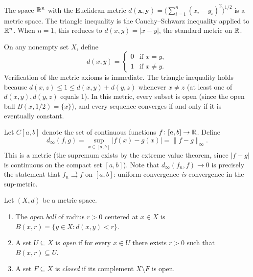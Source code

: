 \documentclass[11pt,a4paper]{article}
\begin{document}
\begin{example}
\label{ex:euclidean_metric}
The space $\mathbb{R}^n$ with the Euclidean metric
$d(\mathbf{x}, \mathbf{y}) = \bigl(\sum_{i=1}^n (x_i - y_i)^2
\bigr)^{1/2}$ is a metric space. The triangle inequality is the
Cauchy--Schwarz inequality applied to $\mathbb{R}^n$. When $n = 1$, this
reduces to $d(x, y) = |x - y|$, the standard metric on $\mathbb{R}$.
\end{example}

\begin{example}
\label{ex:discrete_metric}
On any nonempty set $X$, define
\[
  d(x, y) = \begin{cases} 0 & \text{if } x = y, \\ 1 & \text{if } x \neq y. \end{cases}
\]
Verification of the metric axioms is immediate. The triangle inequality
holds because $d(x, z) \le 1 \le d(x, y) + d(y, z)$ whenever
$x \neq z$ (at least one of $d(x, y), d(y, z)$ equals $1$). In this
metric, every subset is open (since the open ball $B(x, 1/2) = \{x\}$),
and every sequence converges if and only if it is eventually constant.
\end{example}

\begin{example}
\label{ex:sup_metric}
Let $C[a, b]$ denote the set of continuous functions
$f \colon [a, b] \to \mathbb{R}$. Define
\[
  d_\infty(f, g) = \sup_{x \in [a, b]} |f(x) - g(x)|
  = \|f - g\|_\infty.
\]
This is a metric (the supremum exists by the extreme value theorem,
since $|f - g|$ is continuous on the compact set $[a, b]$). Note that
$d_\infty(f_n, f) \to 0$ is precisely the statement that
$f_n \rightrightarrows f$ on $[a, b]$: uniform convergence \emph{is}
convergence in the sup-metric.
\end{example}

\begin{definition}
\label{def:open_closed}
Let $(X, d)$ be a metric space.
\begin{enumerate}[nosep,label=(\roman*)]
  \item The \emph{open ball} of radius $r > 0$ centered at $x \in X$ is
    $B(x, r) = \{y \in X : d(x, y) < r\}$.
  \item A set $U \subseteq X$ is \emph{open} if for every $x \in U$
    there exists $r > 0$ such that $B(x, r) \subseteq U$.
  \item A set $F \subseteq X$ is \emph{closed} if its complement
    $X \setminus F$ is open.
\end{enumerate}
\end{definition}
\end{document}
